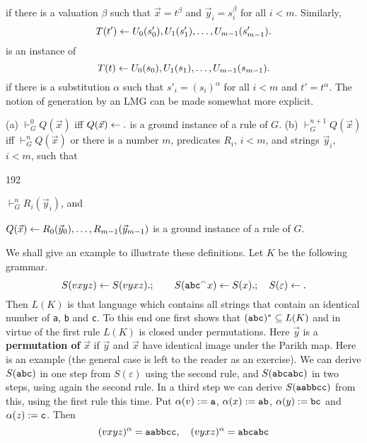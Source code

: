 if there is a valuation $\beta$ such that
$\vec{x} = t^{\beta}$ and $\vec{y}_i = s^{\beta}_i$
for all $i < m$. Similarly, 
\begin{equation}
T(t') \leftarrow U_0(s'_0),U_1(s'_1),\dotsc, U_{m-1}(s'_{m-1}).
\end{equation}
is an instance of 
\begin{equation}
T(t) \leftarrow U_0(s_0),U_1(s_1),\dotsc, U_{m-1}(s_{m-1}).
\end{equation}
if there is a substitution $\alpha$ such that $s'_i = (s_i)^{\alpha}$ 
for all $i < m$ and $t' = t^{\alpha}$. The notion of generation by an 
LMG can be made somewhat more explicit.
\begin{prop}
(a) $\vdash_G^0 Q(\vec{x})$ iff $Q(\vec{x}) \leftarrow .$ is a ground 
instance of a rule of $G$. 
(b) $\vdash_G^{n+1} Q(\vec{x})$ iff $\vdash_G^n Q(\vec{x})$ or
there is a number $m$, predicates $R_i$, $i < m$, and strings
$\vec{y}_i$, $i < m$, such that
\begin{dingautolist}{192}
\item $\vdash_G^n R_i(\vec{y}_i)$, and
\item $Q(\vec{x}) \leftarrow R_0(\vec{y}_0),\dotsc, R_{m-1}(\vec{y}_{m-1})$
is a ground instance of a rule of $G$.
\end{dingautolist}
\end{prop}
We shall give an example to illustrate these definitions.
Let $K$ be the following grammar.
\begin{equation}
S(vxyz) \leftarrow S(vyxz).;
    \qquad S(\mbox{\tt abc}{^{\smallfrown}} x) \leftarrow S(x).;
    \quad S(\varepsilon) \leftarrow.
\end{equation}
Then $L(K)$ is that language which contains all strings
that contain an identical number of {\tt a}, {\tt b} and
{\tt c}. To this end one first shows that $(\mbox{\tt abc})^{\ast}
\subseteq L(K)$ and in virtue of the first rule $L(K)$ is closed
under permutations. Here $\vec{y}$ is a \textbf{permutation of} 
$\vec{x}$ if $\vec{y}$ and $\vec{x}$ have identical
image under the Parikh map. Here is an example (the general case is
left to the reader as an exercise). We can derive
$S(\mbox{\tt abc})$ in one step from
$S(\varepsilon)$ using the second rule, and
$S(\mbox{\tt abcabc})$ in two steps, using
again the second rule. In a third step we can derive
$S(\mbox{\tt aabbcc})$ from this, using the
first rule this time. Put $\alpha(v) := \mbox{\tt a}$,
$\alpha(x) := \mbox{\tt ab}$, $\alpha(y) := \mbox{\tt bc}$
and $\alpha(z) := \mbox{\tt c}$. Then
\begin{equation}
(vxyz)^{\alpha} = \mbox{\tt aabbcc}, \quad (vyxz)^{\alpha} =
\mbox{\tt abcabc}
\end{equation}



